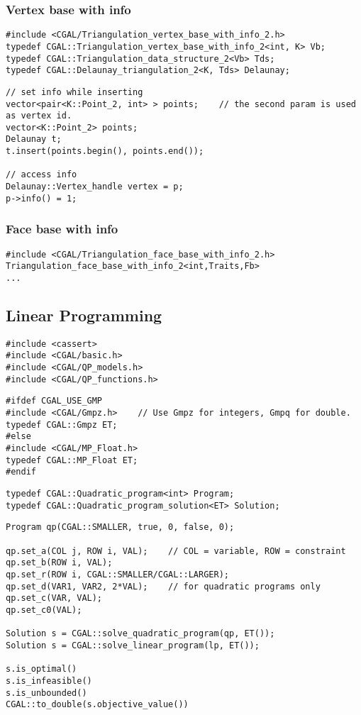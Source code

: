 \documentclass[11pt]{article}
\begin{document}
\subsubsection{Vertex base with info}
\begin{lstlisting}
#include <CGAL/Triangulation_vertex_base_with_info_2.h>
typedef CGAL::Triangulation_vertex_base_with_info_2<int, K> Vb;
typedef CGAL::Triangulation_data_structure_2<Vb> Tds;
typedef CGAL::Delaunay_triangulation_2<K, Tds> Delaunay;
\end{lstlisting}

\begin{lstlisting}
// set info while inserting
vector<pair<K::Point_2, int> > points;    // the second param is used as vertex id.
vector<K::Point_2> points;
Delaunay t;
t.insert(points.begin(), points.end());

// access info
Delaunay::Vertex_handle vertex = p;
p->info() = 1;
\end{lstlisting}

\subsubsection{Face base with info}
\begin{lstlisting}
#include <CGAL/Triangulation_face_base_with_info_2.h>
Triangulation_face_base_with_info_2<int,Traits,Fb>
...
\end{lstlisting}

\subsection{Linear Programming}
\begin{lstlisting}
#include <cassert>
#include <CGAL/basic.h>
#include <CGAL/QP_models.h>
#include <CGAL/QP_functions.h>
\end{lstlisting}


\begin{lstlisting}
#ifdef CGAL_USE_GMP
#include <CGAL/Gmpz.h>    // Use Gmpz for integers, Gmpq for double.
typedef CGAL::Gmpz ET;
#else
#include <CGAL/MP_Float.h>
typedef CGAL::MP_Float ET;
#endif
\end{lstlisting}

\begin{lstlisting}
typedef CGAL::Quadratic_program<int> Program;
typedef CGAL::Quadratic_program_solution<ET> Solution;
\end{lstlisting}

\begin{lstlisting}
Program qp(CGAL::SMALLER, true, 0, false, 0);

qp.set_a(COL j, ROW i, VAL);    // COL = variable, ROW = constraint
qp.set_b(ROW i, VAL);
qp.set_r(ROW i, CGAL::SMALLER/CGAL::LARGER);
qp.set_d(VAR1, VAR2, 2*VAL);    // for quadratic programs only
qp.set_c(VAR, VAL);
qp.set_c0(VAL);

Solution s = CGAL::solve_quadratic_program(qp, ET());
Solution s = CGAL::solve_linear_program(lp, ET());

s.is_optimal()
s.is_infeasible()
s.is_unbounded()
CGAL::to_double(s.objective_value())
\end{lstlisting}
\end{document}
